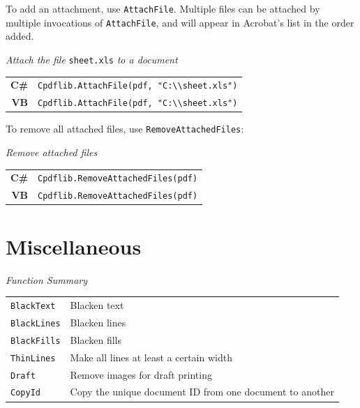 \documentclass[a4paper]{memoir}
\begin{document}
To add an attachment, use \verb!AttachFile!. Multiple files can be attached by
multiple invocations of \verb!AttachFile!, and will appear in Acrobat's list
in the order added.
\begin{framed}
\noindent\textit{Attach the file} \verb!sheet.xls! \textit{to a document}

\vspace{2mm}
\noindent\begin{tabular}{rl}
\small\sffamily\textbf{C\#} &
\begin{minipage}{4in}
\small\verb!Cpdflib.AttachFile(pdf, "C:\\sheet.xls")!
\end{minipage}\\[5mm]
\small\sffamily\textbf{VB} &
\begin{minipage}{4in}
\small\verb!Cpdflib.AttachFile(pdf, "C:\\sheet.xls")!
\end{minipage}\\[5mm]
\end{tabular}
\end{framed}

To remove all attached files, use \verb!RemoveAttachedFiles!:

\begin{framed}
\noindent\textit{Remove attached files}

\vspace{2mm}
\noindent\begin{tabular}{rl}
\small\sffamily\textbf{C\#} &
\begin{minipage}{4in}
\small\verb!Cpdflib.RemoveAttachedFiles(pdf)!
\end{minipage}\\[5mm]
\small\sffamily\textbf{VB} &
\begin{minipage}{4in}
\small\verb!Cpdflib.RemoveAttachedFiles(pdf)!
\end{minipage}\\[5mm]
\end{tabular}
\end{framed}

\chapter{Miscellaneous}
\begin{framed}
\noindent\textit{Function Summary}\\[2mm]
\noindent\begin{tabular}{ll}
\verb!BlackText! & Blacken text\\
\verb!BlackLines! & Blacken lines\\
\verb!BlackFills! & Blacken fills\\
\verb!ThinLines! & Make all lines at least a certain width\\
\verb!Draft! & Remove images for draft printing\\[5mm]
\verb!CopyId! & Copy the unique document ID from one document to another\\
\end{tabular}
\end{framed}
\end{document}
